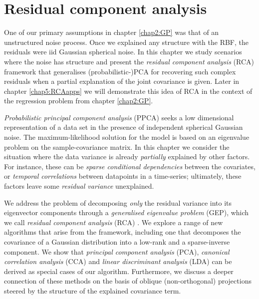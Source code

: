 \chapter[Residual component analysis]{Residual component analysis} \label{chap3:RCA}

\ifpdf
    \graphicspath{{Chapter3/Chapter3Figs/PNG/}{Chapter3/Chapter3Figs/PDF/}{Chapter3/Chapter3Figs/}}
\else
    \graphicspath{{Chapter3/Chapter3Figs/EPS/}{Chapter3/Chapter3Figs/}}
\fi

  
  One of our primary assumptions in chapter \ref{chap2:GP} was that of an unstructured noise process.
  Once we explained any structure with the RBF, the residuals were iid Gaussian spherical noise.
  In this chapter we study scenarios where the noise has structure and present the \emph{residual component analysis} (RCA) framework that generalises (probabilistic-)PCA for recovering such complex residuals when a partial explanation of the joint covariance is given.
    Later in chapter \ref{chap5:RCAapps} we will demonstrate this idea of RCA in the context of the regression problem from chapter \ref{chap2:GP}.
  
  \textit{Probabilistic principal component analysis} (PPCA) seeks a low dimensional representation of a data set in the presence of independent spherical Gaussian noise.
  The maximum-likelihood solution for the model is based on an eigenvalue problem on the sample-covariance matrix.
  In this chapter we consider the situation where the data variance is already \emph{partially} explained by other factors.
  For instance, these can be \emph{sparse conditional dependencies} between the covariates, or \emph{temporal correlations} between datapoints in a time-series; ultimately, these factors leave some \emph{residual variance} unexplained.

  We address the problem of decomposing \emph{only} the residual variance into its eigenvector components through a \emph{generalised eigenvalue problem} (GEP), which we call \textit{residual component analysis} (RCA) \citep{Kalaitzis:rca11, Kalaitzis:rca12}.
  We explore a range of new algorithms that arise from the framework, including  one that decomposes the covariance of a Gaussian distribution into a low-rank and a sparse-inverse component.
  We show that \textit{principal component analysis} (PCA), \textit{canonical correlation analysis} (CCA) and \textit{linear discriminant analysis} (LDA) can be derived as special cases of our algorithm. Furthermore, we discuss a deeper connection of these methods on the basis of oblique (non-orthogonal) projections steered by the structure of the explained covariance term.
  
